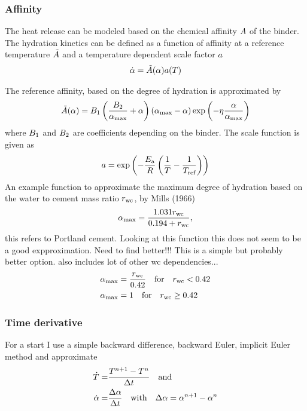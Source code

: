 \subsubsection{Affinity}
The heat release can be modeled based on the chemical affinity $A$ of the binder.
The hydration kinetics can be defined as a function of affinity at a reference temperature $\tilde{A}$ and a temperature dependent scale factor ${a}$
\begin{align}
	\dot{\alpha} = \tilde{A}(\alpha){a}(T)\label{eq:affinitydot}
\end{align}


The reference affinity, based on the degree of hydration is approximated by
\begin{align}
	\tilde{A}(\alpha) = B_1 \left(\frac{B_2}{\alpha_{\text{max}}} + \alpha\right) (\alpha_{\text{max}} - \alpha)\exp\left(-\eta \frac{\alpha}{\alpha_{\text{max}}}\right)
\end{align}
where $B_1$ and $B_2$ are coefficients depending on the binder.
The scale function is given as
\begin{align}
	a = \exp\left(-\frac{E_{\text{a}}}{R}\left(\dfrac{1}{T}-\dfrac{1}{T_{\text{ref}}}\right)\right)
\end{align}
An example function to approximate the maximum degree of hydration based on the water to cement mass ratio $r_{\text{wc}}$, by Mills (1966)
\begin{align}
	\alpha_{\text{max}} = \dfrac{1.031r_{\text{wc}}}{0.194 + r_{\text{wc}}},
\end{align}
this refers to Portland cement. Looking at this function this does not seem to be a good expproximation. Need to find better!!!
This is a simple but probably better option.
\cite{pic_2011_uqso} also includes lot of other wc dependencies...\\
\begin{align}
	\alpha_{\text{max}} &= \frac{r_{\text{wc}}}{0.42}\quad{\text{for}}\quad r_{\text{wc}} < 0.42\\
	\alpha_{\text{max}} &= 1\quad{\text{for}}\quad r_{\text{wc}} \ge 0.42
\end{align}

\subsubsection{Time derivative}
For a start I use a simple backward difference, backward Euler, implicit Euler method and approximate
\begin{align}
	\dot{T} =& \dfrac{T^{n+1}-T^{n}}{\Delta t} \quad\text{and}\label{eq:timediscr}\\
	\dot{\alpha} =& \dfrac{\Delta \alpha}{\Delta t}  \quad\text{with}\quad
	\Delta \alpha  = \alpha^{n+1}- \alpha^{n}
	\label{eq:timediscr2}
\end{align}
